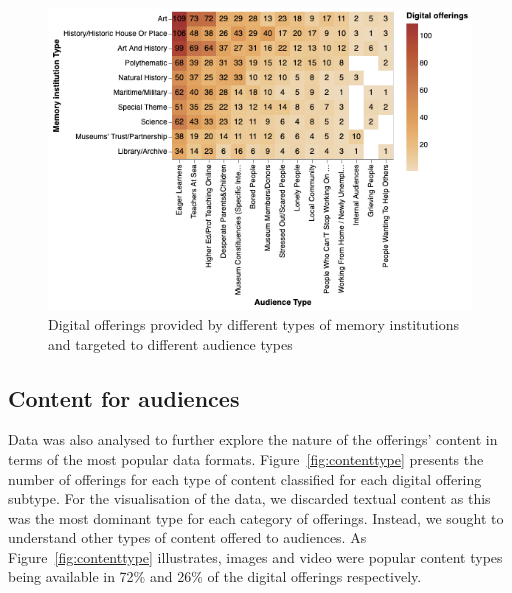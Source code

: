 \documentclass{egpubl}
\begin{document}
\begin{figure}[h]
  \centering
  \includegraphics[width=\linewidth]{images/audiencesboth.png}
  \caption{\label{fig:MTypeAudiences}
           Digital offerings provided by different types of memory institutions and targeted to different audience types}
\end{figure}




\subsection{Content for audiences}
Data was also analysed to further explore the nature of the offerings' content in terms of the most popular data formats. Figure~\ref{fig:contenttype} presents the number of offerings for each type of content classified for each digital offering subtype. For the visualisation of the data, we discarded textual content as this was the most dominant type for each category of offerings. Instead, we sought to understand other types of content offered to audiences. As Figure~\ref{fig:contenttype} illustrates, images and video were popular content types being available in 72\% and 26\% of the digital offerings respectively. 
\end{document}
